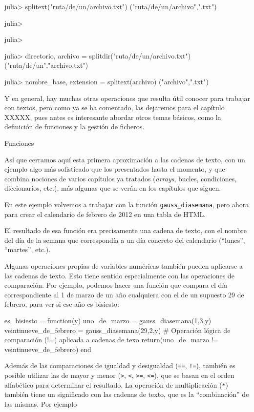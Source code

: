 ﻿\documentclass{article}
\newcommand{\jl}{\texttt}
\begin{document}
{{julia> splitext("ruta/de/un/archivo.txt")
("ruta/de/un/archivo",".txt")

julia> 

julia> 

julia> directorio, archivo = splitdir("ruta/de/un/archivo.txt")
("ruta/de/un","archivo.txt")

julia> nombre_base, extension = splitext(archivo)
("archivo",".txt")

Y en general, hay muchas otras operaciones que resulta útil conocer para trabajar con textos, pero como ya se ha comentado, las dejaremos para el capítulo XXXXX, pues antes es interesante abordar otros temas básicos, como la definición de funciones y la gestión de ficheros.


Funciones


 Así que cerramos aquí esta primera aproximación a las cadenas de texto, con un ejemplo algo más sofisticado que los presentados hasta el momento, y que combina nociones de varios capítulos ya tratados (\emph{arrays}, bucles, condiciones, diccionarios, etc.), más algunas que se verán en los capítulos que siguen.

En este ejemplo volvemos a trabajar con la función \jl{gauss_diasemana}, pero ahora para crear el calendario de febrero de 2012 en una tabla de HTML.



El resultado de esa función era precisamente una cadena de texto, con el nombre del día de la semana que correspondía a un día concreto del calendario (``lunes'', ``martes'', etc.).

Algunas operaciones propias de variables numéricas también pueden aplicarse a las cadenas de texto. Esto tiene sentido especialmente con las operaciones de comparación. Por ejemplo, podemos hacer una función que compara el día correspondiente al 1 de marzo de un año cualquiera con el de un supuesto 29 de febrero, para ver si ese año es bisiesto:

es_bisiesto = function(y)
  uno_de_marzo = gauss_diasemana(1,3,y)
  veintinueve_de_febrero = gauss_diasemana(29,2,y)
  # Operación lógica de comparación (!=) aplicada a cadenas de texo
  return(uno_de_marzo != veintinueve_de_febrero)
end

Además de las comparaciones de igualdad y desigualdad (\jl{==}, \jl{!=}), también es posible utilizar las de mayor y menor (\jl{>}, \jl{<}, \jl{>=}, \jl{<=}), que se basan en el orden alfabético para determinar el resultado. La operación de multiplicación (\jl{*}) también tiene un significado con las cadenas de texto, que es la ``combinación'' de las mismas. Por ejemplo

}}
\end{document}
